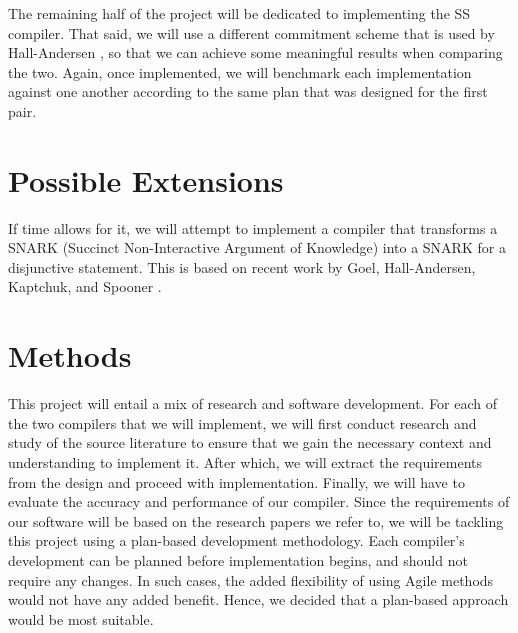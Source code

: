 \documentclass[a4paper,fleqn,12pt]{article}
\begin{document}
The remaining half of the project will be dedicated to implementing the SS compiler. That said, we will use a different commitment scheme that is used by Hall-Andersen \cite{MHAStackSig}, so that we can achieve some meaningful results when comparing the two. Again, once implemented, we will benchmark each implementation against one another according to the same plan that was designed for the first pair.

\section{Possible Extensions}

If time allows for it, we will attempt to implement a compiler that transforms a SNARK (Succinct Non-Interactive Argument of Knowledge) into a SNARK for a disjunctive statement. This is based on recent work by Goel, Hall-Andersen, Kaptchuk, and Spooner \cite{SpeedStacking}.



\section{Methods}
This project will entail a mix of research and software development. For each of the two compilers that we will implement, we will first conduct research and study of the source literature to ensure that we gain the necessary context and understanding to implement it. After which, we will extract the requirements from the design and proceed with implementation. Finally, we will have to evaluate the accuracy and performance of our compiler. Since the requirements of our software will be based on the research papers we refer to, we will be tackling this project using a plan-based development methodology. Each compiler's development can be planned before implementation begins, and should not require any changes. In such cases, the added flexibility of using Agile methods would not have any added benefit. Hence, we decided that a plan-based approach would be most suitable.
\end{document}
